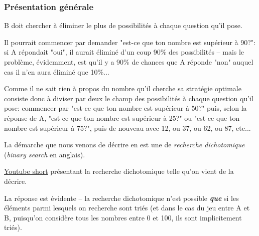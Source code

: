 \documentclass[12pt]{article}
\begin{document}
	\subsubsection*{Présentation générale}

	\begin{MaReponse}
		B doit chercher à éliminer le plus de possibilités à chaque question qu'il pose.
		
		Il pourrait commencer par demander "est-ce que ton nombre est supérieur à 90?": si A répondait "oui", il aurait éliminé d'un coup 90\% des possibilités -- mais le problème, évidemment, est qu'il y a 90\% de chances que A réponde "non" auquel cas il n'en aura éliminé que 10\%...
		
		Comme il ne sait rien à propos du nombre qu'il cherche sa stratégie optimale consiste donc à diviser par deux le champ des possibilités à chaque question qu'il pose: commencer par "est-ce que ton nombre est supérieur à 50?" puis, selon la réponse de A, "est-ce que ton nombre est supérieur à 25?" ou "est-ce que ton nombre est supérieur à 75?", puis de nouveau avec 12, ou 37, ou 62, ou 87, etc...
	\end{MaReponse}
	
	La démarche que nous venons de décrire en est une de \textit{recherche dichotomique} (\textit{binary search} en anglais).
	
	\begin{MaVid}
		\href{https://youtu.be/c-PMOD2O7E4}{Youtube short} présentant la recherche dichotomique telle qu'on vient de la décrire.
	\end{MaVid}
		
	\begin{MaReponse}
		La réponse est évidente -- la recherche dichotomique n'est possible \textbf{\textit{que}} si les éléments parmi lesquels on recherche sont triés (et dans le cas du jeu entre A et B, puisqu'on considère tous les nombres entre 0 et 100, ils sont implicitement triés).
	\end{MaReponse}
\end{document}
